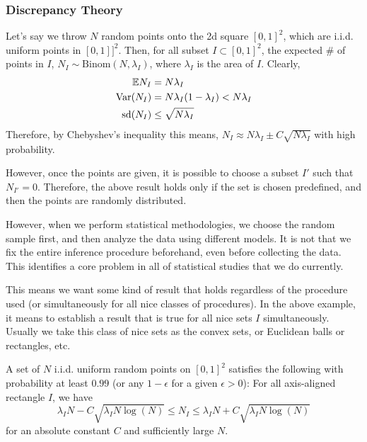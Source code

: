 \documentclass[12pt]{article}
\begin{document}
\subsubsection{Discrepancy Theory}

Let's say we throw $N$ random points onto the 2d square $[0, 1]^2$, which are i.i.d. uniform points in $[0, 1]]^2$. Then, for all subset $I \subset [0, 1]^2$, the expected \# of points in $I$, $N_I \sim \text{Binom}(N, \lambda_I)$, where $\lambda_I$ is the area of $I$. Clearly,
\begin{align*}
    \mathbb{E} N_I         & = N\lambda_I                           \\
    \mathrm{Var}(N_I)      & = N\lambda_I(1-\lambda_I) < N\lambda_I \\
    \text{sd}(N_I) & \leq \sqrt{N\lambda_I}
\end{align*}
\noindent Therefore, by Chebyshev's inequality this means, $N_I \approx N\lambda_I \pm C\sqrt{N\lambda_I}$ with high probability.

\begin{note}
    However, once the points are given, it is possible to choose a subset $I'$ such that $N_{I'} = 0$. Therefore, the above result holds only if the set is chosen predefined, and then the points are randomly distributed.
\end{note}

However, when we perform statistical methodologies, we choose the random sample first, and then analyze the data using different models. It is not that we fix the entire inference procedure beforehand, even before collecting the data. This identifies a core problem in all of statistical studies that we do currently.

This means we want some kind of result that holds regardless of the procedure used (or simultaneously for all nice classes of procedures). In the above example, it means to establish a result that is true for all nice sets $I$ simultaneously. Usually we take this class of nice sets as the convex sets, or Euclidean balls or rectangles, etc.

\begin{theorembox}
    A set of $N$ i.i.d. uniform random points on $[0, 1]^2$ satisfies the following with probability at least $0.99$ (or any $1-\epsilon$ for a given $\epsilon > 0$): For all axis-aligned rectangle $I$, we have
    \begin{equation*}
        \lambda_I N - C\sqrt{\lambda_I N \log(N)} \leq N_I \leq \lambda_I N + C\sqrt{\lambda_I N \log(N)}
    \end{equation*}
    \noindent for an absolute constant $C$ and sufficiently large $N$.
\end{theorembox}
\end{document}
